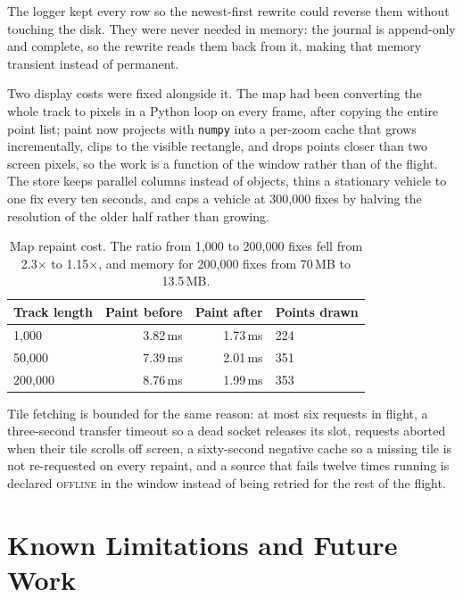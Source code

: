 \documentclass[11pt,a4paper]{article}
\begin{document}
The logger kept every row so the newest-first rewrite could reverse them
without touching the disk. They were never needed in memory: the journal is
append-only and complete, so the rewrite reads them back from it, making
that memory transient instead of permanent.

Two display costs were fixed alongside it. The map had been converting the
whole track to pixels in a Python loop on every frame, after copying the
entire point list; paint now projects with \texttt{numpy} into a per-zoom
cache that grows incrementally, clips to the visible rectangle, and drops
points closer than two screen pixels, so the work is a function of the
window rather than of the flight. The store keeps parallel columns instead
of objects, thins a stationary vehicle to one fix every ten seconds, and
caps a vehicle at 300{,}000 fixes by halving the resolution of the older
half rather than growing.

\begin{table}[htbp]
\centering
\begin{tabularx}{\textwidth}{@{}lrrX@{}}
\toprule
\textbf{Track length} & \textbf{Paint before} & \textbf{Paint after} & \textbf{Points drawn} \\
\midrule
1{,}000   & 3.82\,ms & 1.73\,ms & 224 \\
50{,}000  & 7.39\,ms & 2.01\,ms & 351 \\
200{,}000 & 8.76\,ms & 1.99\,ms & 353 \\
\bottomrule
\end{tabularx}
\caption{Map repaint cost. The ratio from 1{,}000 to 200{,}000 fixes fell
from 2.3$\times$ to 1.15$\times$, and memory for 200{,}000 fixes from 70\,MB
to 13.5\,MB.}
\end{table}

Tile fetching is bounded for the same reason: at most six requests in
flight, a three-second transfer timeout so a dead socket releases its slot,
requests aborted when their tile scrolls off screen, a sixty-second negative
cache so a missing tile is not re-requested on every repaint, and a source
that fails twelve times running is declared \textsc{offline} in the window
instead of being retried for the rest of the flight.

\section{Known Limitations and Future Work}
\label{sec:limitations}
\end{document}
